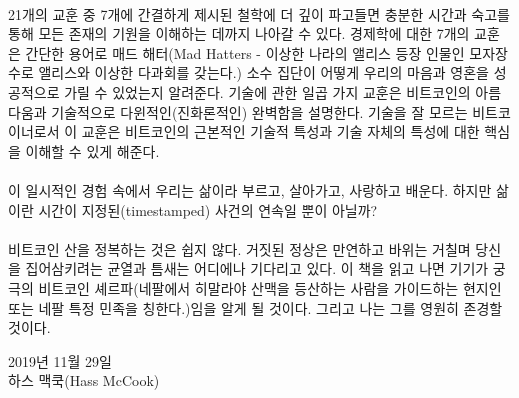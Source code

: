 \paragraph{}
21개의 교훈 중 7개에 간결하게 제시된 철학에 더 깊이 파고들면 충분한 시간과 숙고를 통해 모든 존재의 기원을 이해하는 데까지 나아갈 수 있다. 
경제학에 대한 7개의 교훈은 간단한 용어로 매드 해터(Mad Hatters - 이상한 나라의 앨리스 등장 인물인 모자장수로 앨리스와 이상한 다과회를 갖는다.) 소수 집단이 어떻게 우리의 마음과 영혼을 성공적으로 가릴 수 있었는지 알려준다. 
기술에 관한 일곱 가지 교훈은 비트코인의 아름다움과 기술적으로 다윈적인(진화론적인) 완벽함을 설명한다. 
기술을 잘 모르는 비트코이너로서 이 교훈은 비트코인의 근본적인 기술적 특성과 기술 자체의 특성에 대한 핵심을 이해할 수 있게 해준다.

\paragraph{}
이 일시적인 경험 속에서 우리는 삶이라 부르고, 살아가고, 사랑하고 배운다. 
하지만 삶이란 시간이 지정된(timestamped) 사건의 연속일 뿐이 아닐까? 

\paragraph{}
비트코인 산을 정복하는 것은 쉽지 않다. 거짓된 정상은 만연하고 바위는 거칠며 당신을 집어삼키려는 균열과 틈새는 어디에나 기다리고 있다.
이 책을 읽고 나면 기기가 궁극의 비트코인 셰르파(네팔에서 히말라야 산맥을 등산하는 사람을 가이드하는 현지인 또는 네팔 특정 민족을 칭한다.)임을 알게 될 것이다. 
그리고 나는 그를 영원히 존경할 것이다. 

\begin{flushright}
	2019년 11월 29일 \\
	하스 맥쿡(Hass McCook)
\end{flushright}
